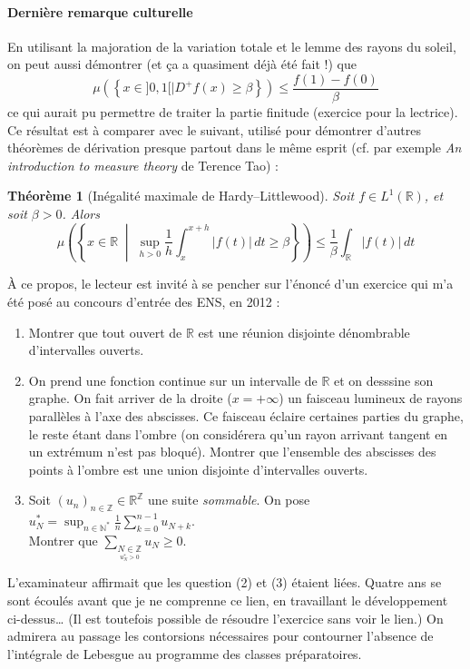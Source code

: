 \documentclass[a4paper, 11pt]{article}
\def\R{\mathbb{R}}
\newtheorem*{theorem}{Théorème}
\begin{document}
\paragraph{Dernière remarque culturelle}

En utilisant la majoration de la variation totale et le lemme des rayons du
soleil, on peut aussi démontrer (et ça a quasiment déjà été fait !) que
\[ \mu\left( \left\{ x \in ]0,1[ \mid D^+f(x) \geq \beta \right\} \right)
  \leq \frac{f(1)-f(0)}{\beta} \]
ce qui aurait pu permettre de traiter la partie finitude (exercice pour la
lectrice). Ce résultat est à comparer avec le suivant, utilisé pour démontrer
d'autres théorèmes de dérivation presque partout dans le même esprit (cf. par
exemple \emph{An introduction to measure theory} de Terence Tao) :
\begin{theorem}[Inégalité maximale de Hardy--Littlewood]
  Soit $f \in L^1(\R)$, et soit $\beta > 0$. Alors
  \[ \mu\left( \left\{ x \in \R \;\middle|\; \sup_{h > 0} \frac{1}{h} \int_x^{x+h}
        |f(t)|\,dt \geq \beta \right\} \right)
    \leq \frac{1}{\beta} \int_\R |f(t)|\,dt \]
\end{theorem}

À ce propos, le lecteur est invité à se pencher sur l'énoncé d'un exercice qui
m'a été posé au concours d'entrée des ENS, en 2012 :
\begin{enumerate}
\item Montrer que tout ouvert de $\mathbb{R}$ est une réunion disjointe dénombrable d'intervalles ouverts.
\item On prend une fonction continue sur un intervalle de $\mathbb{R}$ et on desssine son graphe. On fait arriver de la droite ($x = +\infty$) un faisceau lumineux de rayons parallèles à l'axe des abscisses. Ce faisceau éclaire certaines parties du graphe, le reste étant dans l'ombre (on considérera qu'un rayon arrivant tangent en un extrémum n'est pas bloqué). Montrer que l'ensemble des abscisses des points à l'ombre est une union disjointe d'intervalles ouverts.
\item Soit $(u_n)_{n \in \mathbb{Z}} \in \mathbb{R}^{\mathbb{Z}}$ une suite \emph{sommable}. On pose $u^*_N = \displaystyle \sup_{n \in \mathbb{N}^*} \frac{1}{n} \sum_{k=0}^{n-1} u_{N+k}$.\\ Montrer que $\displaystyle \sum_{\underset{u_N^* > 0}{N \in \mathbb{Z}}} u_N \geq 0$.
\end{enumerate}
L'examinateur affirmait que les question (2) et (3) étaient liées. Quatre ans se
sont écoulés avant que je ne comprenne ce lien, en travaillant le développement
ci-dessus… (Il est toutefois possible de résoudre l'exercice sans voir le lien.)
On admirera au passage les contorsions nécessaires pour contourner l'absence de
l'intégrale de Lebesgue au programme des classes préparatoires.
\end{document}
